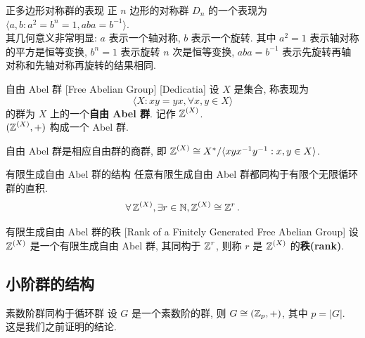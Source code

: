         \begin{ins}
            {正多边形对称群的表现}
            正 \(n\) 边形的对称群 \(D_n\) 的一个表现为 \(\langle a,b: a^2=b^n=1, aba=b^{-1}\rangle\). \\
            其几何意义非常明显: \(a\) 表示一个轴对称, \(b\) 表示一个旋转. 其中 \(a^2=1\) 表示轴对称的平方是恒等变换, \(b^n=1\) 表示旋转 \(n\) 次是恒等变换, \(aba=b^{-1}\) 表示先旋转再轴对称和先轴对称再旋转的结果相同.
        \end{ins}

        \begin{dfn}
            {自由 Abel 群}
            [Free Abelian Group]
            [Dedicatia]
            设 \(X\) 是集合, 称表现为
            \[\langle X: xy=yx,\forall x,y\in X\rangle\]
            的群为 \(X\) 上的一个\textbf{自由 Abel 群}. 记作 \(\operatorname{\mathbb{Z}}^{(X)}\).\\
            \((\operatorname{\mathbb{Z}}^{(X)}, +)\) 构成一个 Abel 群. 
        \end{dfn}

        \begin{rmk}
            [Dedicatia]
            自由 Abel 群是相应自由群的商群, 即 \(\operatorname{\mathbb{Z}}^{(X)}\cong X^*/\langle xyx^{-1}y^{-1}: x,y\in X\rangle\).\\
        \end{rmk}

        \begin{thm}
            {有限生成自由 Abel 群的结构}
            任意有限生成自由 Abel 群都同构于有限个无限循环群的直积. 
            \[\forall\operatorname{\mathbb{Z}}^{(X)},\exists r\in\operatorname{\mathbb{N}}, \operatorname{\mathbb{Z}}^{(X)}\cong\operatorname{\mathbb{Z}}^r.\]
        \end{thm}

        \begin{dfn}
            {有限生成自由 Abel 群的秩}
            [Rank of a Finitely Generated Free Abelian Group]
            设 \(\operatorname{\mathbb{Z}}^{(X)}\) 是一个有限生成自由 Abel 群, 其同构于 \(\operatorname{\mathbb{Z}}^r\), 则称 \(r\) 是 \(\operatorname{\mathbb{Z}}^{(X)}\) 的\textbf{秩(rank)}.
        \end{dfn}

    \subsection{小阶群的结构}

            \begin{thm}
                {素数阶群同构于循环群}
                设 \(G\) 是一个素数阶的群, 则 \(G\cong (\operatorname{\mathbb{Z}}_p, +)\), 其中 \(p=|G|\).\\
                这是我们之前证明的结论.
            \end{thm}

